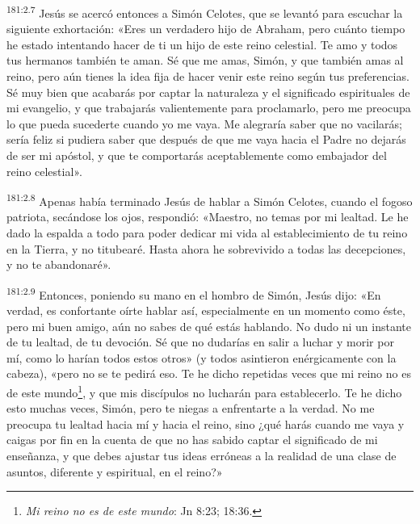 \par 
\textsuperscript{181:2.7} Jesús se acercó entonces a Simón Celotes, que se levantó para escuchar la siguiente exhortación: «Eres un verdadero hijo de Abraham, pero cuánto tiempo he estado intentando hacer de ti un hijo de este reino celestial. Te amo y todos tus hermanos también te aman. Sé que me amas, Simón, y que también amas al reino, pero aún tienes la idea fija de hacer venir este reino según tus preferencias. Sé muy bien que acabarás por captar la naturaleza y el significado espirituales de mi evangelio, y que trabajarás valientemente para proclamarlo, pero me preocupa lo que pueda sucederte cuando yo me vaya. Me alegraría saber que no vacilarás; sería feliz si pudiera saber que después de que me vaya hacia el Padre no dejarás de ser mi apóstol, y que te comportarás aceptablemente como embajador del reino celestial».

\par 
\textsuperscript{181:2.8} Apenas había terminado Jesús de hablar a Simón Celotes, cuando el fogoso patriota, secándose los ojos, respondió: «Maestro, no temas por mi lealtad. Le he dado la espalda a todo para poder dedicar mi vida al establecimiento de tu reino en la Tierra, y no titubearé. Hasta ahora he sobrevivido a todas las decepciones, y no te abandonaré».

\par 
\textsuperscript{181:2.9} Entonces, poniendo su mano en el hombro de Simón, Jesús dijo: «En verdad, es confortante oírte hablar así, especialmente en un momento como éste, pero mi buen amigo, aún no sabes de qué estás hablando. No dudo ni un instante de tu lealtad, de tu devoción. Sé que no dudarías en salir a luchar y morir por mí, como lo harían todos estos otros» (y todos asintieron enérgicamente con la cabeza), «pero no se te pedirá eso. Te he dicho repetidas veces que mi reino no es de este mundo\footnote{\textit{Mi reino no es de este mundo}: Jn 8:23; 18:36.}, y que mis discípulos no lucharán para establecerlo. Te he dicho esto muchas veces, Simón, pero te niegas a enfrentarte a la verdad. No me preocupa tu lealtad hacia mí y hacia el reino, sino ¿qué harás cuando me vaya y caigas por fin en la cuenta de que no has sabido captar el significado de mi enseñanza, y que debes ajustar tus ideas erróneas a la realidad de una clase de asuntos, diferente y espiritual, en el reino?»

